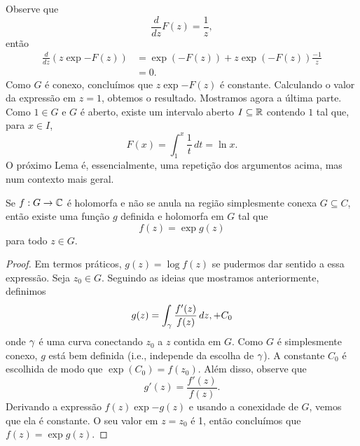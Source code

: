     Observe que 
    \begin{equation*}
        \frac{d}{dz}F(z) = \frac{1}{z},
    \end{equation*}    
    então 
    \begin{align*}
        \frac{d}{dz}(z\exp{-F(z)}) &= \exp{(-F(z))} + z\exp{(-F(z))}\frac{-1}{z} \\
        & = 0.
    \end{align*}
    Como $G$ é conexo, concluímos que $z\exp{-F(z)}$ é constante. Calculando o 
    valor da expressão em $z = 1$, obtemos o resultado. Mostramos agora a última
    parte. Como $1 \in G$ e $G$ é aberto, existe um intervalo aberto 
    $I \subseteq \mathbb{R}$ contendo $1$ tal que, para $x \in I$,
    \begin{equation*}
        F(x) = \int_{1}^{x} \frac{1}{t} \, dt = \ln{x}.
    \end{equation*}    
    O próximo Lema é, essencialmente, uma repetição dos argumentos acima, mas 
    num contexto mais geral.
    \begin{lema}%
    \label{lema-ramo-log}
        Se $f : G \to \mathbb{C}$ é holomorfa e não se anula na região simplesmente conexa 
        $G \subseteq C$, então existe uma função $g$ definida e holomorfa em $G$ 
        tal que 
        \begin{equation*}
            f(z) = \exp{g(z)}
        \end{equation*}
        para todo $z \in G$.
    \end{lema}
    \begin{proof}
        Em termos práticos, $g(z) = \log f(z)$ se pudermos dar sentido a essa
        expressão. Seja $z_0 \in G$. Seguindo as ideias que mostramos anteriormente,
        definimos
        \begin{equation*}
            g(z) = \int_{\gamma} \frac{f'(z)}{f(z)} \, dz, + C_0
        \end{equation*}
        onde $\gamma$ é uma curva conectando $z_0$ a $z$ contida em $G$. Como $G$ é
        simplesmente conexo, $g$ está bem definida (i.e., independe da escolha de
        $\gamma$). A constante $C_0$ é escolhida de modo que $\exp(C_0) = f(z_0)$. 
        Além disso, observe que 
        \begin{equation*}
            g'(z) = \frac{f'(z)}{f(z)}.
        \end{equation*}
        Derivando a expressão $f(z)\exp{-g(z)}$ e usando a conexidade de $G$, vemos
        que ela é constante. O seu valor em $z = z_0$ é 1, então concluímos que 
        $f(z) = \exp{g(z)}$.
    \end{proof}
    
